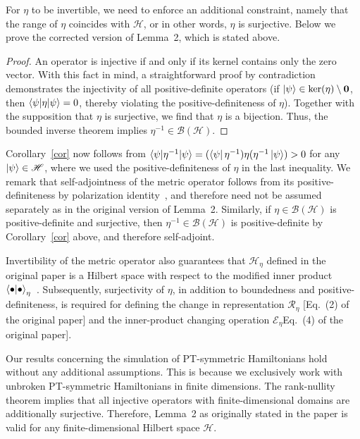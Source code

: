 \documentclass[amsmath,amssymb,aps,pra,superscriptaddress,twocolumn]{revtex4-2}
\begin{document}
For $\eta$ to be invertible, we need to enforce an additional constraint,
namely that the range of $\eta$ coincides with $\mathscr{H}$, or in other words, $\eta$ is surjective.
Below we prove the corrected version of Lemma~2, which is stated above.
\begin{proof}
An operator is injective if and only if its kernel contains only the zero vector. With this fact in mind, a straightforward proof by contradiction demonstrates the injectivity of all positive-definite operators (if  $\ket{\psi}\in\ker(\eta) \setminus \bm{0}$, then 
$\braket{\psi|\eta|\psi}=0$, thereby violating the positive-definiteness of $\eta$). Together with the supposition that $\eta$ is surjective, we find that $\eta$ is a bijection. Thus, the bounded inverse theorem \cite[Thm.~14.5.1]{Narici2010} implies $\eta^{-1}\in\mathcal{B}\left(\mathscr{H}\right)$.
\end{proof}


Corollary~\ref{cor} now follows from
$\braket{\psi|\eta^{-1}|\psi} = (\bra{\psi}\eta^{-1})\eta(\eta^{-1}\ket{\psi}) > 0$ 
for any $\ket{\psi} \in \mathscr{H}$,
where we used the positive-definiteness of $\eta$ in the last inequality.
We remark that self-adjointness of the metric operator follows from 
its positive-definiteness by polarization identity~\cite{BB03},
and therefore need not be assumed separately as in the original 
version of Lemma~2. 
Similarly, if $\eta\in \mathcal{B}(\mathscr{H})$ is positive-definite and surjective,
then $\eta^{-1} \in \mathcal{B}(\mathscr{H})$ is positive-definite
by Corollary~\ref{cor} above, and therefore self-adjoint.


Invertibility of the metric operator also guarantees that $\mathscr{H}_\eta$ defined in
the original paper is a Hilbert space with respect to the modified inner product 
$\braket{\bullet|\bullet}_\eta$~\cite[Appendix A]{SGH92}. 
Subsequently, surjectivity of $\eta$,
in addition to boundedness and positive-definiteness, is required for defining 
the change in representation  $\mathcal{R}_\eta$ [Eq.~(2) of the original paper] and 
the inner-product changing operation $\mathcal{E}_{\eta}$Eq.~(4) of the original paper].


Our results concerning the simulation of PT-symmetric Hamiltonians hold without any
additional assumptions.
This is because we exclusively work with unbroken PT-symmetric Hamiltonians in finite dimensions. The rank-nullity theorem implies that all injective operators with finite-dimensional domains are additionally surjective. Therefore, Lemma~2 as originally stated in the paper is valid
for any finite-dimensional Hilbert space $\mathscr{H}$. 
\end{document}

